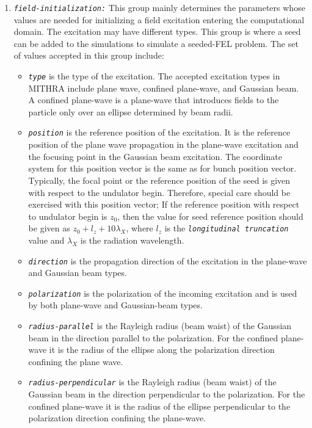 \begin{enumerate}
\item {\tt \small \em field-initialization:} This group mainly determines the parameters whose values are needed for initializing a field excitation entering the computational domain. The excitation may have different types. This group is where a seed can be added to the simulations to simulate a seeded-FEL problem. The set of values accepted in this group include:
%
\begin{itemize}
	\item {\tt \small \em type} is the type of the excitation. The accepted excitation types in MITHRA include plane wave, confined plane-wave, and Gaussian beam. A confined plane-wave is a plane-wave that introduces fields to the particle only over an ellipse determined by beam radii.
	\item {\tt \small \em position} is the reference position of the excitation. It is the reference position of the plane wave propagation in the plane-wave excitation and the focusing point in the Gaussian beam excitation. The coordinate system for this position vector is the same as for bunch position vector. Typically, the focal point or the reference position of the seed is given with respect to the undulator begin. Therefore, special care should be exercised with this position vector;
	If the reference position with respect to undulator begin is $z_0$, then the value for seed reference position should be given as $z_0 + l_z + 10\lambda_X$, where $l_z$ is the {\tt \small \em longitudinal truncation} value and $\lambda_X$ is the radiation wavelength.
	\item {\tt \small \em direction} is the propagation direction of the excitation in the plane-wave and Gaussian beam types.
	\item {\tt \small \em polarization} is the polarization of the incoming excitation and is used by both plane-wave and Gaussian-beam types.
	\item {\tt \small \em radius-parallel} is the Rayleigh radius (beam waist) of the Gaussian beam in the direction parallel to the polarization. For the confined plane-wave it is the radius of the ellipse along the polarization direction confining the plane wave.
	\item {\tt \small \em radius-perpendicular} is the Rayleigh radius (beam waist) of the Gaussian beam in the direction perpendicular to the polarization. For the confined plane-wave it is the radius of the ellipse perpendicular to the polarization direction confining the plane-wave.

\end{itemize}
\end{enumerate}
